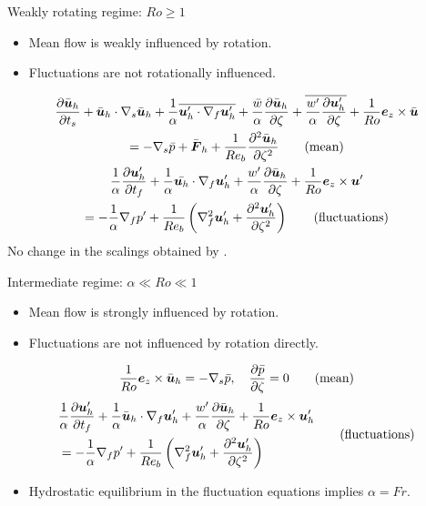 \documentclass{beamer}
\begin{document}
\begin{frame}{Weakly rotating regime: $Ro \ge 1$}

    \begin{itemize}
        \item Mean flow is weakly influenced by rotation.
        \item Fluctuations are not rotationally influenced.
    \end{itemize}
    {\scriptsize
    \begin{gather*}
    \frac{\partial \bar{\boldsymbol{u}}_h}{\partial t_s} + \bar{\boldsymbol{u}}_h\cdot \nabla_s\bar{\boldsymbol{u}}_h
    + \frac{1}{\alpha}\overline{\boldsymbol{u}_h'\cdot\nabla_f\boldsymbol{u}_h'}
    + \frac{\bar{w}}{\alpha}\frac{\partial \bar{\boldsymbol{u}}_h}{\partial \zeta} 
    + \overline{\frac{w'}{\alpha}\frac{\partial \boldsymbol{u}_h'}{\partial \zeta}} + \frac{1}{Ro}\boldsymbol{e}_z \times \bar{\boldsymbol{u}}\\
    = -\nabla_s\bar{p} + \bar{\boldsymbol{F}}_h + \frac{1}{Re_b}\frac{\partial^2 \bar{\boldsymbol{u}}_h}{\partial \zeta^2} \tag{mean}\\
    \frac{1}{\alpha}\frac{\partial \boldsymbol{u}_h'}{\partial t_f} 
    + \frac{1}{\alpha}\bar{\boldsymbol{u}_h}\cdot\nabla_f\boldsymbol{u}_h'
    + \frac{w'}{\alpha}\frac{\partial \bar{\boldsymbol{u}}_h}{\partial \zeta} + \frac{1}{Ro}\boldsymbol{e}_z \times \boldsymbol{u}'\\
    = -\frac{1}{\alpha}\nabla_f p' + \frac{1}{Re_b}\left( \nabla_f^2\boldsymbol{u}_h' + \frac{\partial^2 \boldsymbol{u}_h'}{\partial \zeta^2}\right) \tag{fluctuations}
    \end{gather*}
    }
    No change in the scalings obtained by \citet{Chinial2022}.
\end{frame}

\begin{frame}{Intermediate regime: $\alpha \ll Ro \ll 1$}

    \begin{itemize}
        \item Mean flow is strongly influenced by rotation.
        \item Fluctuations are not influenced by rotation directly. 
    \end{itemize}
    {\footnotesize
    \begin{gather*}
        \frac{1}{Ro}\boldsymbol{e}_z \times \bar{\boldsymbol{u}}_h = -\nabla_s \bar{p}, \quad \frac{\partial \bar{p}}{\partial \zeta} = 0 \tag{mean}
    \end{gather*} 
    \begin{equation*}
        \begin{split}
        &\frac{1}{\alpha}\frac{\partial \boldsymbol{u}_h'}{\partial t_f} 
        + \frac{1}{\alpha}\bar{\boldsymbol{u}}_h\cdot\nabla_f\boldsymbol{u}_h'
        + \frac{w'}{\alpha}\frac{\partial \bar{\boldsymbol{u}}_h}{\partial \zeta} + \frac{1}{Ro}\boldsymbol{e}_z \times \boldsymbol{u}'_h\\ 
        &= -\frac{1}{\alpha}\nabla_f p' + \frac{1}{Re_b}\left( \nabla_f^2\boldsymbol{u}_h' + \frac{\partial^2 \boldsymbol{u}_h'}{\partial \zeta^2}\right) 
        \end{split}
        \tag{fluctuations}
    \end{equation*}
    }
    
    \begin{itemize}
    
    \item Hydrostatic equilibrium in the fluctuation equations implies $\alpha = Fr$. 
\end{itemize}
\end{frame}
\end{document}
